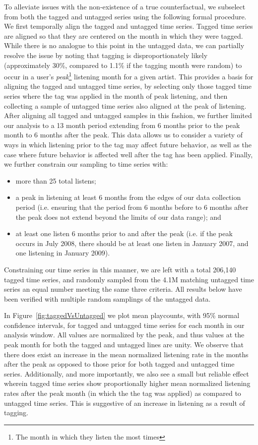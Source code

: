 To alleviate issues with the non-existence of a true counterfactual, we subselect from both the tagged and untagged series using the following formal procedure. We first temporally align the tagged and untagged time series. Tagged time series are aligned so that they are centered on the month in which they were tagged.  While there is no analogue to this point in the untagged data, we can partially resolve the issue by noting that tagging is disproportionately likely (approximately 30\%, compared to 1.1\% if the tagging month were random) to occur in a user's \emph{peak}\footnote{The month in which they listen the most times} listening month for a given artist. This provides a basis for aligning the tagged and untagged time series, by selecting only those tagged time series where the tag was applied in the month of peak listening, and then collecting a sample of untagged time series also aligned at the peak of listening. After aligning all tagged and untagged samples in this fashion, we further limited our analysis to a 13 month period extending from 6 months prior to the peak month to 6 months after the peak. This data allows us to consider a variety of ways in which listening prior to the tag may affect future behavior, as well as the case where future behavior is affected well after the tag has been applied. Finally, we further constrain our sampling to time series with:
\begin{itemize}
\item more than 25 total listens; 
\item a peak in listening at least 6 months from the edges of our data collection period (i.e. ensuring that the period from 6 months before to 6 months after the peak does not extend beyond the limits of our data range); and
\item at least one listen 6 months prior to and after the peak (i.e. if the peak occurs in July 2008, there should be at least one listen in January 2007, and one listening in January 2009).
\end{itemize}

Constraining our time series in this manner, we are left with a total 206,140 tagged time series, and randomly sampled from the 4.1M matching untagged time series an equal number meeting the same three criteria.  All results below have been verified with multiple random samplings of the untagged data.

In Figure~\ref{fig:taggedVsUntagged} we plot mean playcounts, with 95\% normal confidence intervals, for tagged and untagged time series for each month in our analysis window. All values are normalized by the peak, and thus values at the peak month for both the tagged and untagged lines are unity. We observe that there does exist an increase in the mean normalized listening rate in the months after the peak as opposed to those prior for both tagged and untagged time series. Additionally, and more importantly, we also see a small but reliable effect wherein tagged time series show proportionally higher mean normalized listening rates after the peak month (in which the the tag was applied) as compared to untagged time series. This is suggestive of an increase in listening as a result of tagging.

